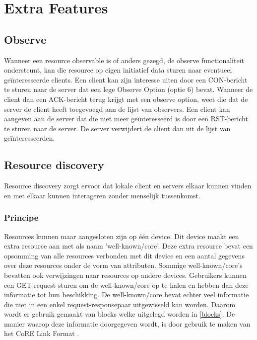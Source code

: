 \section{Extra Features}

\subsection{Observe} \label{observe}

Wanneer een resource observable is of anders gezegd, de observe functionaliteit ondersteunt, kan die resource op eigen initiatief data sturen naar eventueel ge\"{i}nteresseerde clients. Een client kan zijn interesse uiten door een CON-bericht te sturen naar de server dat een lege Observe Option (optie 6) bevat. Wanneer de client dan een ACK-bericht terug krijgt met een observe option, weet die dat de server de client heeft toegevoegd aan de lijst van observers. Een client kan aangeven aan de server dat die niet meer ge\"{i}nteresseerd is door een RST-bericht te sturen naar de server. De server verwijdert de client dan uit de lijst van ge\"{i}nteresseerden.

\subsection{Resource discovery} \label{resourceDiscovery}
Resource discovery zorgt ervoor dat lokale client en servers elkaar kunnen vinden en met elkaar kunnen interageren zonder menselijk tussenkomst.

\subsubsection{Principe}
\noindent
Resources kunnen maar aangesloten zijn op \'{e}\'{e}n device. Dit device maakt een extra resource aan met als naam 'well-known/core'. Deze extra resource bevat een opsomming van alle resources verbonden met dit device en een aantal gegevens over deze resources onder de vorm van attributen. Sommige well-known/core's bevatten ook verwijzingen naar resources op andere devices. Gebruikers kunnen een GET-request sturen om de well-known/core op te halen en hebben dan deze informatie tot hun beschikking. De well-known/core bevat echter veel informatie die niet in een enkel request-responsepaar uitgewisseld kan worden. Daarom wordt er gebruik gemaakt van blocks welke uitgelegd worden in \ref{blocks}. De manier waarop deze informatie doorgegeven wordt, is door gebruik te maken van het CoRE Link Format \cite{coapDiscovery}.

